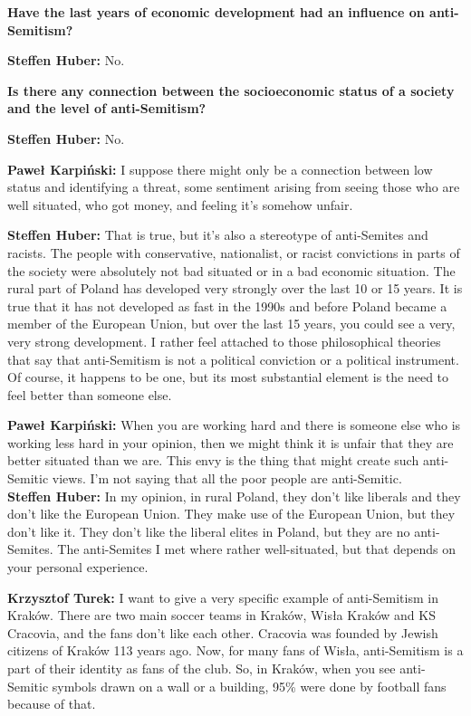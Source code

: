 \textbf{Have the last years of economic development had an influence on anti-Semitism?} 

\textbf{Steffen Huber:} No. 

\textbf{Is there any connection between the socioeconomic status of a society and the level of anti-Semitism?} 

\textbf{Steffen Huber:} No.\par
\textbf{Paweł Karpiński:} I suppose there might only be a connection between low status and identifying a threat, some sentiment arising from seeing those who are well situated, who got money, and feeling it's somehow unfair. \par  
\textbf{Steffen Huber:} That is true, but it's also a stereotype of anti-Semites and racists. The people with conservative, nationalist, or racist convictions in parts of the society were absolutely not bad situated or in a bad economic situation. The rural part of Poland has developed very strongly over the last 10 or 15 years. It is true that it has not developed as fast in the 1990s and before Poland became a member of the European Union, but over the last 15 years, you could see a very, very strong development. I rather feel attached to those philosophical theories that say that anti-Semitism is not a political conviction or a political instrument. Of course, it happens to be one, but its most substantial element is the need to feel better than someone else. \par 
\textbf{Paweł Karpiński:} When you are working hard and there is someone else who is working less hard in your opinion, then we might think it is unfair that they are better situated than we are. This envy is the thing that might create such anti-Semitic views. I’m not saying that all the poor people are anti-Semitic.\\  
\textbf{Steffen Huber:} In my opinion, in rural Poland, they don't like liberals and they don't like the European Union. They make use of the European Union, but they don't like it. They don't like the liberal elites in Poland, but they are no anti-Semites. The anti-Semites I met where rather well-situated, but that depends on your personal experience.\par
\textbf{Krzysztof Turek:} I want to give a very specific example of anti-Semitism in Kraków. There are two main soccer teams in Kraków, Wisła Kraków and KS Cracovia, and the fans don't like each other. Cracovia was founded by Jewish citizens of Kraków 113 years ago. Now, for many fans of Wisła, anti-Semitism is a part of their identity as fans of the club. So, in Kraków, when you see anti-Semitic symbols drawn on a wall or a building, 95\% were done by football fans because of that. 

